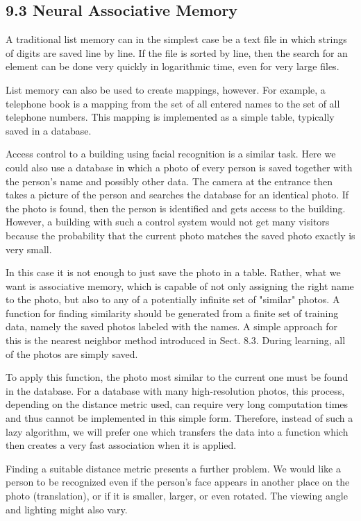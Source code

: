 \documentclass[10pt]{article}
\begin{document}
\subsection*{9.3 Neural Associative Memory}
A traditional list memory can in the simplest case be a text file in which strings of digits are saved line by line. If the file is sorted by line, then the search for an element can be done very quickly in logarithmic time, even for very large files.

List memory can also be used to create mappings, however. For example, a telephone book is a mapping from the set of all entered names to the set of all telephone numbers. This mapping is implemented as a simple table, typically saved in a database.

Access control to a building using facial recognition is a similar task. Here we could also use a database in which a photo of every person is saved together with the person's name and possibly other data. The camera at the entrance then takes a picture of the person and searches the database for an identical photo. If the photo is found, then the person is identified and gets access to the building. However, a building with such a control system would not get many visitors because the probability that the current photo matches the saved photo exactly is very small.

In this case it is not enough to just save the photo in a table. Rather, what we want is associative memory, which is capable of not only assigning the right name to the photo, but also to any of a potentially infinite set of "similar" photos. A function for finding similarity should be generated from a finite set of training data, namely the saved photos labeled with the names. A simple approach for this is the nearest neighbor method introduced in Sect. 8.3. During learning, all of the photos are simply saved.

To apply this function, the photo most similar to the current one must be found in the database. For a database with many high-resolution photos, this process, depending on the distance metric used, can require very long computation times and thus cannot be implemented in this simple form. Therefore, instead of such a lazy algorithm, we will prefer one which transfers the data into a function which then creates a very fast association when it is applied.

Finding a suitable distance metric presents a further problem. We would like a person to be recognized even if the person's face appears in another place on the photo (translation), or if it is smaller, larger, or even rotated. The viewing angle and lighting might also vary.
\end{document}
